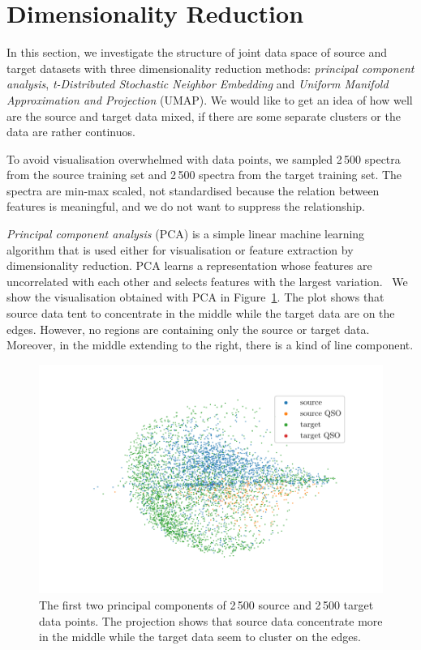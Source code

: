 \section{Dimensionality Reduction}

In this section, we investigate the structure of joint data space of source and target datasets with three dimensionality reduction methods:
\textit{principal component analysis},
\textit{t-Distributed Stochastic Neighbor Embedding}
and \textit{Uniform Manifold Approximation and Projection} (UMAP).
We would like to get an idea of how well are the source and target data mixed,
if there are some separate clusters or the data are rather continuos.

To avoid visualisation overwhelmed with data points,
we sampled 2\,500 spectra from the source training set
and 2\,500 spectra from the target training set.
The spectra are min-max scaled, not standardised
because the relation between features is meaningful,
and we do not want to suppress the relationship.

\textit{Principal component analysis} (PCA) is a simple linear machine learning algorithm
that is used either for visualisation or feature extraction by dimensionality reduction.
PCA learns a representation whose features are uncorrelated with each other
and selects features with the largest variation.~\cite{goodfellow2016}
We show the visualisation obtained with PCA in Figure~\ref{pca}.
The plot shows that source data tent to concentrate in the middle
while the target data are on the edges.
However, no regions are containing only the source or target data.
Moreover, in the middle extending to the right, there is a kind of line component.

\begin{figure}
\includegraphics[width=\textwidth]{img/pca.pdf}
\caption[PCA visualisation of source and target data distributions]{
	The first two principal components of 2\,500 source
	and 2\,500 target data points.
	The projection shows that source data concentrate more in the middle
	while the target data seem to cluster on the edges.
	}
\label{pca}
\end{figure}

